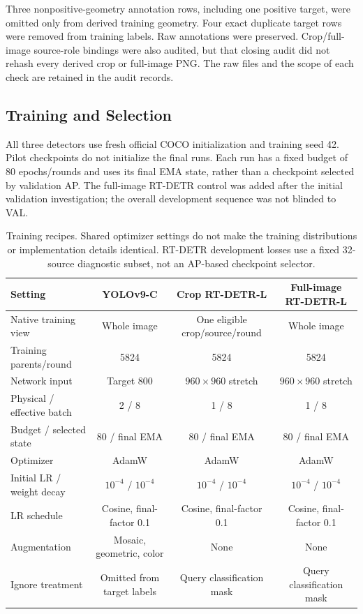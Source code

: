 \documentclass[journal]{IEEEtran}
\begin{document}
Three nonpositive-geometry annotation rows, including one positive target, were omitted only from derived training geometry. Four exact duplicate target rows were removed from training labels. Raw annotations were preserved. Crop/full-image source-role bindings were also audited, but that closing audit did not rehash every derived crop or full-image PNG. The raw files and the scope of each check are retained in the audit records.

\subsection{Training and Selection}
All three detectors use fresh official COCO initialization and training seed 42. Pilot checkpoints do not initialize the final runs. Each run has a fixed budget of 80 epochs/rounds and uses its final EMA state, rather than a checkpoint selected by validation AP. The full-image RT-DETR control was added after the initial validation investigation; the overall development sequence was not blinded to VAL.

\begin{table}[t]
\caption{Training recipes. Shared optimizer settings do not make the training distributions or implementation details identical. RT-DETR development losses use a fixed 32-source diagnostic subset, not an AP-based checkpoint selector.}
\label{tab:training}
\centering\small
\begin{tabular}{lccc}
\toprule
Setting & YOLOv9-C & Crop RT-DETR-L & Full-image RT-DETR-L\\
\midrule
Native training view & Whole image & One eligible crop/source/round & Whole image\\
Training parents/round & 5824 & 5824 & 5824\\
Network input & Target 800 & $960\times960$ stretch & $960\times960$ stretch\\
Physical / effective batch & 2 / 8 & 1 / 8 & 1 / 8\\
Budget / selected state & 80 / final EMA & 80 / final EMA & 80 / final EMA\\
Optimizer & AdamW & AdamW & AdamW\\
Initial LR / weight decay & $10^{-4}$ / $10^{-4}$ & $10^{-4}$ / $10^{-4}$ & $10^{-4}$ / $10^{-4}$\\
LR schedule & Cosine, final-factor 0.1 & Cosine, final-factor 0.1 & Cosine, final-factor 0.1\\
Augmentation & Mosaic, geometric, color & None & None\\
Ignore treatment & Omitted from target labels & Query classification mask & Query classification mask\\
\bottomrule
\end{tabular}
\end{table}
\end{document}
